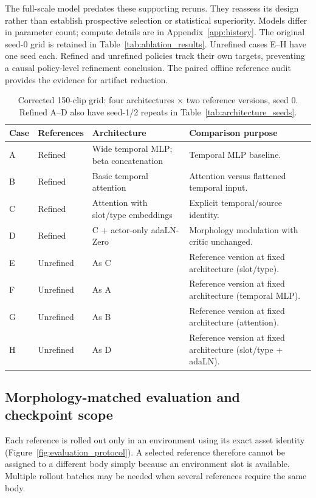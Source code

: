 \documentclass[11pt]{article}
\begin{document}
The full-scale model predates these supporting reruns. They reassess its
design rather than establish prospective selection or statistical superiority.
Models differ in parameter count; compute details are in Appendix~\ref{app:history}.
The original seed-0 grid is retained in Table~\ref{tab:ablation_results}.
Unrefined cases E--H have one seed each. Refined and unrefined policies track
their own targets, preventing a causal policy-level refinement conclusion.
The paired offline reference audit provides the evidence for artifact reduction.
\begin{table}[t]
\centering
\small
\caption{Corrected 150-clip grid: four architectures $\times$ two reference
versions, seed 0. Refined A--D also have seed-1/2 repeats in Table~\ref{tab:architecture_seeds}.}\label{tab:ablations}
\begin{tabularx}{\linewidth}{@{}llYY@{}}
\toprule
Case & References & Architecture & Comparison purpose \\
\midrule
A & Refined & Wide temporal MLP; beta concatenation &
Temporal MLP baseline. \\
B & Refined & Basic temporal attention &
Attention versus flattened temporal input. \\
C & Refined & Attention with slot/type embeddings &
Explicit temporal/source identity. \\
D & Refined & C + actor-only adaLN-Zero &
Morphology modulation with critic unchanged. \\
E & Unrefined & As C &
Reference version at fixed architecture (slot/type). \\
F & Unrefined & As A &
Reference version at fixed architecture (temporal MLP). \\
G & Unrefined & As B &
Reference version at fixed architecture (attention). \\
H & Unrefined & As D &
Reference version at fixed architecture (slot/type + adaLN). \\
\bottomrule
\end{tabularx}
\end{table}
\subsection{Morphology-matched evaluation and checkpoint scope}\label{sec:evaluation_protocol}

Each reference is rolled out only in an environment using its exact asset
identity (Figure~\ref{fig:evaluation_protocol}). A selected reference
therefore cannot be assigned to a different body simply because an
environment slot is available. Multiple rollout batches may be needed when
several references require the same body.
\end{document}
